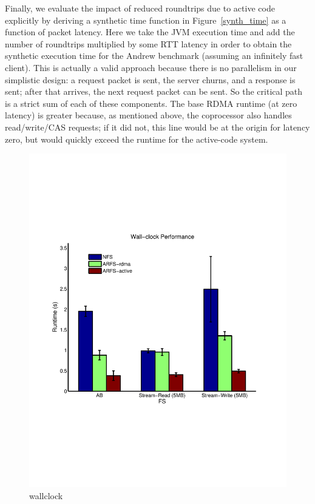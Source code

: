 \documentclass[10pt]{article}
\begin{document}
Finally, we evaluate the impact of reduced roundtrips due to active
code explicitly by deriving a synthetic time function in
Figure~\ref{synth_time} as a function of packet latency. Here we take
the JVM execution time and add the number of roundtrips multiplied by
some RTT latency in order to obtain the synthetic execution time for
the Andrew benchmark (assuming an infinitely fast client). This is
actually a valid approach because there is no parallelism in our
simplistic design: a request packet is sent, the server churns, and a
response is sent; after that arrives, the next request packet can be
sent. So the critical path is a strict sum of each of these
components. The base RDMA runtime (at zero latency) is greater
because, as mentioned above, the coprocessor also handles
read/write/CAS requests; if it did not, this line would be at the
origin for latency zero, but would quickly exceed the runtime for the
active-code system.

\begin{figure}
  \centering
\includegraphics[scale=0.5, trim = 0 200 0 200]{../../results/matlab/wallclock.pdf}
  \caption{wallclock}\label{wallclock}
\end{figure}
\end{document}
